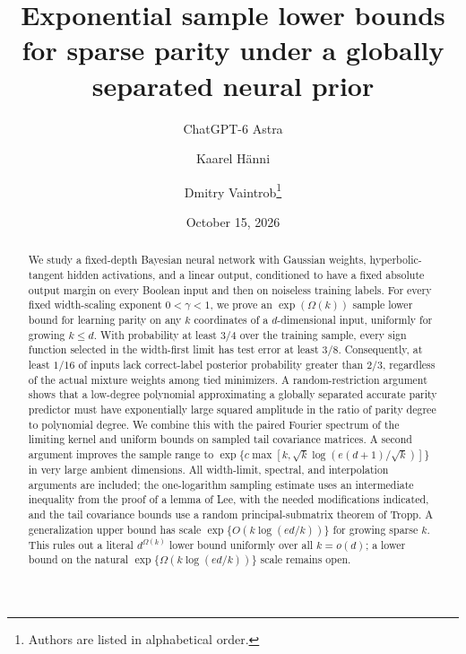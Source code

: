 \documentclass[11pt]{article}
\title{Exponential sample lower bounds for sparse parity under a globally separated neural prior}
\author{ChatGPT-6 Astra \and Kaarel H\"anni \and Dmitry Vaintrob\thanks{Authors are listed in alphabetical order.}}
\date{October 15, 2026}
\theoremstyle{remark}\newtheorem{remark}[theorem]{Remark}
\begin{document}
\maketitle
\begin{abstract}
We study a fixed-depth Bayesian neural network with Gaussian weights,
hyperbolic-tangent hidden activations, and a linear output, conditioned
to have a fixed absolute output margin on every Boolean input and then
on noiseless training labels. For every fixed width-scaling exponent
$0<\gamma<1$, we prove an $\exp(\Omega(k))$ sample lower bound for
learning parity on any $k$ coordinates of a $d$-dimensional input,
uniformly for growing $k\le d$. With probability at least $3/4$ over
the training sample, every sign function selected in the width-first
limit has test error at least $3/8$. Consequently, at least $1/16$ of
inputs lack correct-label posterior probability greater than $2/3$,
regardless of the actual mixture weights among tied minimizers.
A random-restriction argument shows that a low-degree polynomial
approximating a globally separated accurate parity predictor must have
exponentially large squared amplitude in the ratio of parity degree to
polynomial degree. We combine this with the paired Fourier spectrum of
the limiting kernel and uniform bounds on sampled tail covariance
matrices. A second argument improves the sample range to
$\exp\{c\max[k,\sqrt{k}\log(e(d+1)/\sqrt{k})]\}$ in very large ambient
dimensions. All width-limit, spectral, and interpolation arguments are included;
the one-logarithm sampling estimate uses an intermediate inequality from
the proof of a lemma of Lee, with the needed modifications indicated, and
the tail covariance bounds use a random principal-submatrix theorem of
Tropp. A generalization upper bound has scale
$\exp\{O(k\log(ed/k))\}$ for growing sparse $k$. This rules out a
literal $d^{\Omega(k)}$ lower bound uniformly over all $k=o(d)$;
a lower bound on the natural $\exp\{\Omega(k\log(ed/k))\}$ scale
remains open.
\end{abstract}
\end{document}
